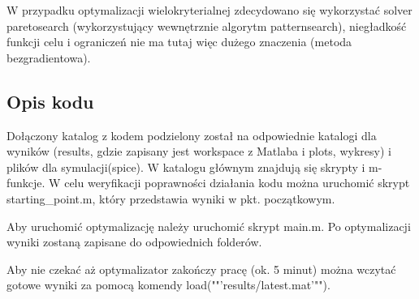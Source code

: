 \documentclass{article}
\begin{document}
W przypadku optymalizacji wielokryterialnej zdecydowano się wykorzystać solver paretosearch (wykorzystujący wewnętrznie algorytm patternsearch), niegładkość funkcji celu i ograniczeń nie ma tutaj więc dużego znaczenia (metoda bezgradientowa).
\subsection{Opis kodu}
Dołączony katalog z kodem podzielony został na odpowiednie katalogi dla wyników (results, gdzie zapisany jest workspace z Matlaba i plots, wykresy) i plików dla symulacji(spice).
W katalogu głównym znajdują się skrypty i m-funkcje. W celu weryfikacji poprawności działania kodu można uruchomić skrypt starting\_point.m, który przedstawia wyniki w pkt. początkowym.

Aby uruchomić optymalizację należy uruchomić skrypt main.m. Po optymalizacji wyniki zostaną zapisane do odpowiednich folderów.

Aby nie czekać aż optymalizator zakończy pracę (ok. 5 minut) można wczytać gotowe wyniki za pomocą komendy load(""'results/latest.mat'"").
\end{document}
